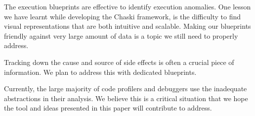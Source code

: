 \documentclass{sig-alternate}
\begin{document}
The execution blueprints are effective to identify execution anomalies. One lesson we have learnt while developing the Chaski framework, is the difficulty to find visual representations that are both intuitive and scalable. Making our blueprints friendly against very large amount of data is a topic we still need to properly address.


Tracking down the cause and source of side effects is often a crucial piece of information. We plan to address this with dedicated blueprints.

Currently, the large majority of code profilers and debuggers use the inadequate abstractions in their analysis. We believe this is a critical situation that we hope the tool and ideas presented in this paper will contribute to address.




\end{document}
